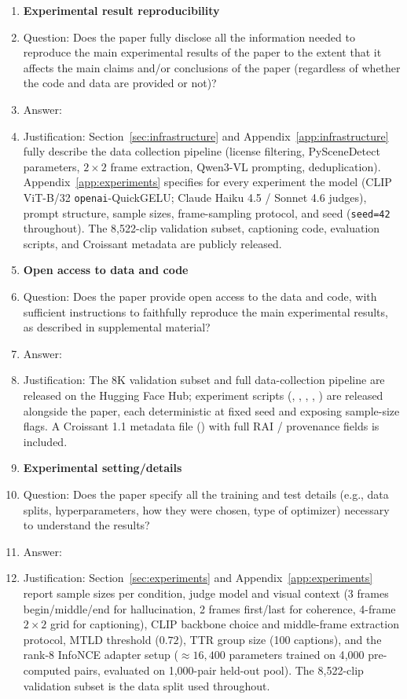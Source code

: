 \begin{enumerate}
\item {\bf Experimental result reproducibility}
    \item[] Question: Does the paper fully disclose all the information needed to reproduce the main experimental results of the paper to the extent that it affects the main claims and/or conclusions of the paper (regardless of whether the code and data are provided or not)?
    \item[] Answer: \answerYes{}
    \item[] Justification: Section~\ref{sec:infrastructure} and Appendix~\ref{app:infrastructure} fully describe the data collection pipeline (license filtering, PySceneDetect parameters, $2\times 2$ frame extraction, Qwen3-VL prompting, deduplication). Appendix~\ref{app:experiments} specifies for every experiment the model (CLIP ViT-B/32 \texttt{openai}-QuickGELU; Claude Haiku 4.5 / Sonnet 4.6 judges), prompt structure, sample sizes, frame-sampling protocol, and seed (\texttt{seed=42} throughout). The 8{,}522-clip validation subset, captioning code, evaluation scripts, and Croissant metadata are publicly released.

\item {\bf Open access to data and code}
    \item[] Question: Does the paper provide open access to the data and code, with sufficient instructions to faithfully reproduce the main experimental results, as described in supplemental material?
    \item[] Answer: \answerYes{}
    \item[] Justification: The 8K validation subset and full data-collection pipeline are released on the Hugging Face Hub; experiment scripts (, , , , ) are released alongside the paper, each deterministic at fixed seed and exposing sample-size flags. A Croissant 1.1 metadata file () with full RAI / provenance fields is included.

\item {\bf Experimental setting/details}
    \item[] Question: Does the paper specify all the training and test details (e.g., data splits, hyperparameters, how they were chosen, type of optimizer) necessary to understand the results?
    \item[] Answer: \answerYes{}
    \item[] Justification: Section~\ref{sec:experiments} and Appendix~\ref{app:experiments} report sample sizes per condition, judge model and visual context (3 frames begin/middle/end for hallucination, 2 frames first/last for coherence, 4-frame $2\times 2$ grid for captioning), CLIP backbone choice and middle-frame extraction protocol, MTLD threshold ($0.72$), TTR group size (100 captions), and the rank-8 InfoNCE adapter setup ($\approx 16{,}400$ parameters trained on 4{,}000 pre-computed pairs, evaluated on 1{,}000-pair held-out pool). The 8{,}522-clip validation subset is the data split used throughout.


\end{enumerate}
